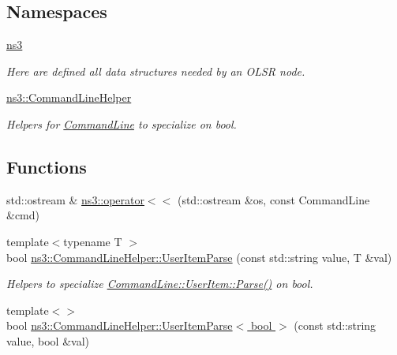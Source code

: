 \subsection*{Namespaces}
\begin{DoxyCompactItemize}
\item 
 \hyperlink{namespacens3}{ns3}
\begin{DoxyCompactList}\small\item\em Here are defined all data structures needed by an O\+L\+SR node. \end{DoxyCompactList}\item 
 \hyperlink{namespacens3_1_1CommandLineHelper}{ns3\+::\+Command\+Line\+Helper}
\begin{DoxyCompactList}\small\item\em Helpers for \hyperlink{classns3_1_1CommandLine}{Command\+Line} to specialize on bool. \end{DoxyCompactList}\end{DoxyCompactItemize}
\subsection*{Functions}
\begin{DoxyCompactItemize}
\item 
std\+::ostream \& \hyperlink{namespacens3_af0089a784a5dac17bc4cdeced18072ed}{ns3\+::operator$<$$<$} (std\+::ostream \&os, const Command\+Line \&cmd)
\end{DoxyCompactItemize}
{\bf }\par
\begin{DoxyCompactItemize}
\item 
{\footnotesize template$<$typename T $>$ }\\bool \hyperlink{group__commandlinehelper_ga284d64fb24301f2cfdec01edbba8a6da}{ns3\+::\+Command\+Line\+Helper\+::\+User\+Item\+Parse} (const std\+::string value, T \&val)
\begin{DoxyCompactList}\small\item\em Helpers to specialize \hyperlink{classns3_1_1CommandLine_1_1UserItem_a1e35f03bcc7eea7343fcef8beec53dbb}{Command\+Line\+::\+User\+Item\+::\+Parse()} on bool. \end{DoxyCompactList}\item 
{\footnotesize template$<$$>$ }\\bool \hyperlink{group__commandlinehelper_gaab7ae136fb6933489d59fb29a9b52438}{ns3\+::\+Command\+Line\+Helper\+::\+User\+Item\+Parse$<$ bool $>$} (const std\+::string value, bool \&val)
\end{DoxyCompactItemize}

